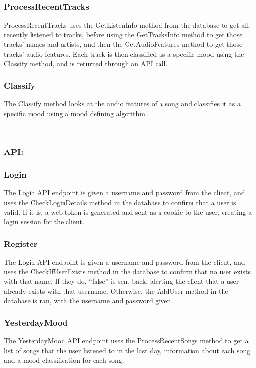 \documentclass[11pt]{report}
\begin{document}
\subsubsection{ProcessRecentTracks}
ProcessRecentTracks uses the GetListenInfo method from the database to get all recently listened to tracks, before using the GetTracksInfo method to get those tracks’ names and artists, and then the GetAudioFeatures method to get those tracks’ audio features. Each track is then classified as a specific mood using the Classify method, and is returned through an API call.

\subsubsection{Classify}
The Classify method looks at the audio features of a song and classifies it as a specific mood using a mood defining algorithm.


\leavevmode \\

\subsubsection{API:}

\hrulefill

\subsubsection{Login}
The Login API endpoint is given a username and password from the client, and uses the CheckLoginDetails method in the database to confirm that a user is valid. If it is, a web token is generated and sent as a cookie to the user, creating a login session for the client.

\subsubsection{Register}
The Login API endpoint is given a username and password from the client, and uses the CheckIfUserExists method in the database to confirm that no user exists with that name. If they do, “false” is sent back, alerting the client that a user already exists with that username. Otherwise, the AddUser method in the database is ran, with the username and password given.

\subsubsection{YesterdayMood}
The YesterdayMood API endpoint uses the ProcessRecentSongs method to get a list of songs that the user listened to in the last day, information about each song and a mood classification for each song.
\end{document}
